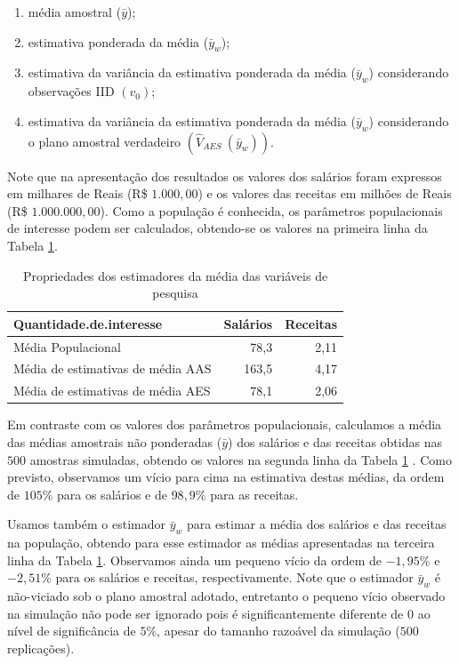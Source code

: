 \documentclass[]{book}
\theoremstyle{definition}
\theoremstyle{definition}
\theoremstyle{definition}
\theoremstyle{remark}
\begin{document}
\begin{enumerate}
\def\labelenumi{\arabic{enumi}.}
\item
  média amostral (\(\bar{y}\));
\item
  estimativa ponderada da média (\(\bar{y}_{w}\));
\item
  estimativa da variância da estimativa ponderada da média
  (\(\bar{y}_{w}\)) considerando observações IID
  \(\left( v_{0}\right)\);
\item
  estimativa da variância da estimativa ponderada da média
  (\(\bar{y}_{w}\)) considerando o plano amostral verdadeiro
  \(\left( \hat{V}_{AES}\ \left( \bar{y}_{w}\right) \right)\).
\end{enumerate}

Note que na apresentação dos resultados os valores dos salários foram
expressos em milhares de Reais (R\$ \(1.000,00\)) e os valores das
receitas em milhões de Reais (R\$ \(1.000.000,00\)). Como a população é
conhecida, os parâmetros populacionais de interesse podem ser
calculados, obtendo-se os valores na primeira linha da Tabela
\ref{tab:proestmed}.

\begin{table}

\caption{\label{tab:proestmed}Propriedades dos estimadores da média das variáveis de pesquisa}
\centering
\begin{tabular}[t]{lrr}
\toprule
Quantidade.de.interesse & Salários & Receitas\\
\midrule
Média Populacional & 78,3 & 2,11\\
Média de estimativas de média AAS & 163,5 & 4,17\\
Média de estimativas de média AES & 78,1 & 2,06\\
\bottomrule
\end{tabular}
\end{table}

Em contraste com os valores dos parâmetros populacionais, calculamos a
média das médias amostrais não ponderadas (\(\bar{y}\)) dos salários e
das receitas obtidas nas \(500\) amostras simuladas, obtendo os valores
na segunda linha da Tabela \ref{tab:proestmed} . Como previsto,
observamos um vício para cima na estimativa destas médias, da ordem de
\(105\%\) para os salários e de \(98,9\%\) para as receitas.

Usamos também o estimador \(\bar{y}_{w}\) para estimar a média dos
salários e das receitas na população, obtendo para esse estimador as
médias apresentadas na terceira linha da Tabela \ref{tab:proestmed}.
Observamos ainda um pequeno vício da ordem de \(-1,95\%\) e \(-2,51\%\)
para os salários e receitas, respectivamente. Note que o estimador
\(\bar{y}_{w}\) é não-viciado sob o plano amostral adotado, entretanto o
pequeno vício observado na simulação não pode ser ignorado pois é
significantemente diferente de \(0\) ao nível de significância de
\(5\%\), apesar do tamanho razoável da simulação (\(500\) replicações).
\end{document}
